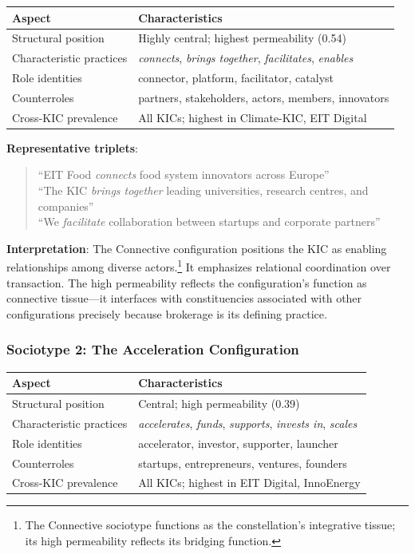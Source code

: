 \documentclass[../main.tex]{subfiles}
\begin{document}
\begin{center}
\small
\begin{tabular}{ll}
\toprule
\textbf{Aspect} & \textbf{Characteristics} \\
\midrule
Structural position & Highly central; highest permeability (0.54) \\
Characteristic practices & \textit{connects}, \textit{brings together}, \textit{facilitates}, \textit{enables} \\
Role identities & connector, platform, facilitator, catalyst \\
Counterroles & partners, stakeholders, actors, members, innovators \\
Cross-KIC prevalence & All KICs; highest in Climate-KIC, EIT Digital \\
\bottomrule
\end{tabular}
\end{center}

\textbf{Representative triplets}:
\begin{quote}
\small
``EIT Food \textit{connects} food system innovators across Europe''\\
``The KIC \textit{brings together} leading universities, research centres, and companies''\\
``We \textit{facilitate} collaboration between startups and corporate partners''
\end{quote}

\textbf{Interpretation}: The Connective configuration positions the KIC as enabling relationships among diverse actors.\footnote{The Connective sociotype functions as the constellation's integrative tissue; its high permeability reflects its bridging function.} It emphasizes relational coordination over transaction. The high permeability reflects the configuration's function as connective tissue---it interfaces with constituencies associated with other configurations precisely because brokerage is its defining practice.

\subsubsection{Sociotype 2: The Acceleration Configuration}

\begin{center}
\small
\begin{tabular}{ll}
\toprule
\textbf{Aspect} & \textbf{Characteristics} \\
\midrule
Structural position & Central; high permeability (0.39) \\
Characteristic practices & \textit{accelerates}, \textit{funds}, \textit{supports}, \textit{invests in}, \textit{scales} \\
Role identities & accelerator, investor, supporter, launcher \\
Counterroles & startups, entrepreneurs, ventures, founders \\
Cross-KIC prevalence & All KICs; highest in EIT Digital, InnoEnergy \\
\bottomrule
\end{tabular}
\end{center}
\end{document}
